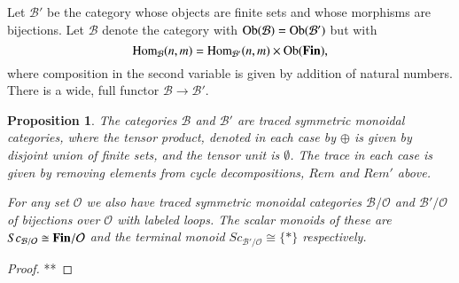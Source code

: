 \documentclass{amsart}
\newcommand{\longnote}[2][4.9in]{\fcolorbox{black}{yellow}{\parbox{#1}{\color{black} #2}}}
\newcommand{\shortnote}[1]{\fcolorbox{black}{yellow}{\color{black} #1}}
\def\tn{\textnormal}
\def\mc{\mathcal}
\def\Hom{\tn{Hom}}
\def\Tr{\tn{Tr}}
\def\Ob{\tn{Ob}}
\def\singleton{{\{*\}}}
\def\to{\rightarrow}
\def\taking{\colon}
\def\iso{\cong}
\newcommand{\To}[1]{\xrightarrow{#1}}
\newcommand{\From}[1]{\xleftarrow{#1}}
\def\id{\tn{id}}
\def\mcB{\mc{B}}
\def\mcM{\mc{M}}
\def\mcO{\mc{O}}
\def\Fin{{\bf Fin}}
\newtheorem{proposition}[subsubsection]{Proposition}
\theoremstyle{remark}
\theoremstyle{definition}
\newtheorem{notation}[subsubsection]{Notation}
\begin{document}
Let $\mcB'$ be the category whose objects are finite sets and whose morphisms are bijections. Let $\mcB$ denote the category with $\Ob(\mcB)=\Ob(\mcB')$ but with 
$$\Hom_{\mcB}(n,m)=\Hom_{\mcB'}(n,m)\times\Ob(\Fin),$$
where composition in the second variable is given by addition of natural numbers. There is a wide, full functor $\mcB\to\mcB'$.

\begin{proposition}

The categories $\mcB$ and $\mcB'$ are traced symmetric monoidal categories, where the tensor product, denoted in each case by $\oplus$ is given by disjoint union of finite sets, and the tensor unit is $\emptyset$. The trace in each case is given by removing elements from cycle decompositions, $Rem$ and $Rem'$ above.

For any set $\mcO$ we also have traced symmetric monoidal categories $\mcB/\mcO$ and $\mcB'/\mcO$ of bijections over $\mcO$ with labeled loops. The scalar monoids of these are $Sc_{\mcB/\mcO}\iso\Fin/\mcO$ and the terminal monoid $Sc_{\mcB'/\mcO}\iso\singleton$ respectively. 

\end{proposition}

\begin{proof}

**

\end{proof}
%
%
%
\end{document}
